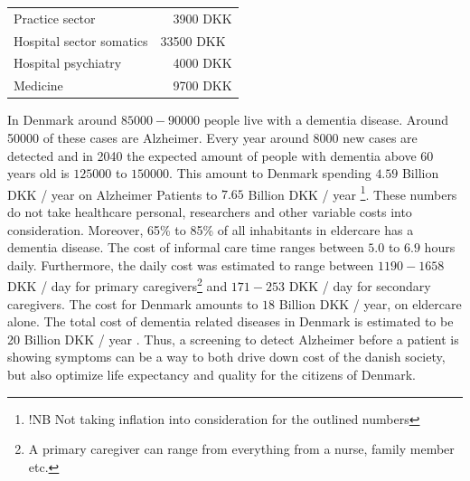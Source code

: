 \documentclass[12pt, fleqn, titlepage]{article}
\newcommand{\1}[1]{\mathds{1}\left[#1\right]}
\begin{document}
		
		\begin{table}[H]
			\begin{tabular}{ll}
				Practice sector   &\ \ 3900  DKK  \\
				Hospital sector somatics  & 33500 DKK \\
				Hospital psychiatry  &  \ \ 4000  DKK  \\
				Medicine & \ \ 9700  DKK 
			\end{tabular}
		\end{table}
		
		In Denmark around $ 85000-90000 $ people live with a dementia disease. Around 50000 of these cases are Alzheimer. Every year around $ 8000 $ new cases are detected and in 2040 the expected amount of people with dementia above 60 years old is $ 125000 $ to $ 150000 $. This amount to Denmark spending $ 4.59 $ Billion DKK / year on Alzheimer Patients to $ 7.65 $ Billion DKK / year \footnote{!NB Not taking inflation into consideration for the outlined numbers}. These numbers do not take healthcare personal, researchers and other variable costs into consideration. Moreover, 65\% to 85\% of all inhabitants in eldercare has a dementia disease. The cost of informal care time ranges between $ 5.0 $ to $ 6.9 $ hours daily. Furthermore, the daily cost was estimated to range between $ 1190 - 1658 $ DKK / day for primary caregivers\footnote{A primary caregiver can range from everything from a nurse, family member etc.} and $ 171 - 253 $ DKK / day for secondary caregivers. The cost for Denmark amounts to $ 18 $ Billion DKK / year, on eldercare alone. The total cost of dementia related diseases in Denmark is estimated to be 20 Billion DKK / year \cite{Alzheimerforeningen} \cite{informal_care}. Thus, a screening to detect Alzheimer before a patient is showing symptoms can be a way to both drive down cost of the danish society, but also optimize life expectancy and quality for the citizens of Denmark.
		
\end{document}
